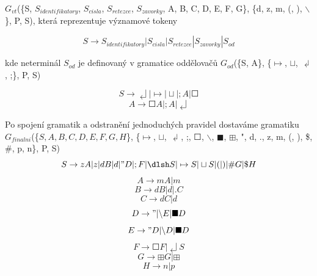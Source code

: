 \documentclass[a4paper,11pt]{article}
\begin{document}
$G_{vt}$(\{S, $S_{identifikatory}$, $S_{cisla}$, $S_{retezce}$, $S_{zavorky}$, A, B, C, D, E, F, G\}, \{d, z, m, (, ), $\backslash$ \}, P, S), která reprezentuje významové tokeny 

$$S \rightarrow S_{identifikatory} | S_{cisla} | S_{retezce} | S_{zavorky} | S_{od}$$

kde neterminál $S_{od}$ je definovaný v gramatice oddělovačů $G_{od}$(\{S, A\}, \{$\mapsto$, $\sqcup$, $\dlsh$, ;\}, P, S)

$$S \rightarrow \dlsh | \mapsto | \sqcup | ;A | \Square$$
$$A \rightarrow \Square A | ;A | \dlsh $$

Po spojení gramatik a odstranění jednoduchých pravidel dostaváme gramatiku
$G_{finalni}$(\{$S, A, B, C, D, E, F, G, H$\}, \{$\mapsto$, $\sqcup$, $\dlsh$, ;, $\Square$, $\backslash$, $\blacksquare$, $\boxplus$, ", d, ., z, m, (, ), \$, \#, p, n\}, P, S)
$$S \rightarrow zA | z | dB | d | "D | ;F | \dlsh S | \mapsto S | \sqcup S | ( | ) | \#G | \$H$$
$$A \rightarrow mA | m$$
$$B \rightarrow dB | d | .C$$
$$C \rightarrow dC | d$$
$$D \rightarrow " | \backslash E | \blacksquare D$$
$$E \rightarrow "D | \backslash D | \blacksquare D$$
$$F \rightarrow \Square F | \dlsh S$$
$$G \rightarrow \boxplus G | \boxplus$$
$$H \rightarrow n | p$$
\end{document}
